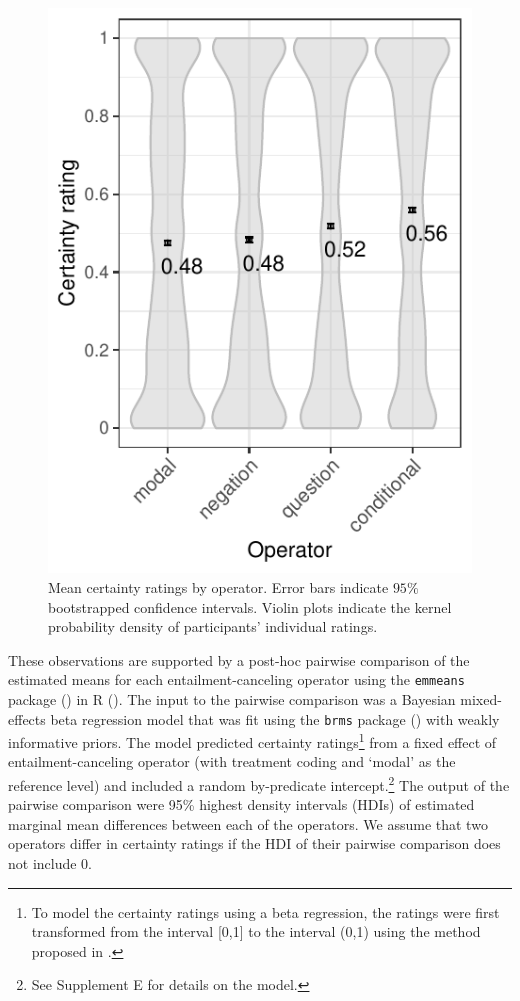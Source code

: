 \documentclass[a4paper,12pt,twoside]{article}
\begin{document}
            \begin{figure}[ht]
				\centering
				\includegraphics[scale = .7]{certainty-operator.pdf}
				\caption{Mean certainty ratings by operator. Error bars indicate $95\%$ bootstrapped confidence intervals. Violin plots indicate the kernel probability density of participants' individual ratings.
                }
				\label{fig:op-ratings}
			\end{figure}

        These observations are supported by a post-hoc pairwise comparison of the estimated means for each entailment-canceling operator using the \texttt{emmeans} package (\citealt{emmeans}) in R (\citealt{r}). The input to the pairwise comparison was a Bayesian mixed-effects beta regression model that was fit using the \texttt{brms} package (\citealt{buerkner2017}) with weakly informative priors. The model predicted certainty ratings\footnote{To model the certainty ratings using a beta regression, the ratings were first transformed from the interval [0,1] to the interval (0,1) using the method proposed in \citealt{smithson_better_2006}.} from a fixed effect of entailment-canceling operator (with treatment coding and `modal' as the reference level) and included a random by-predicate intercept.\footnote{See Supplement E for details on the model.} The output of the pairwise comparison were 95\% highest density intervals (HDIs) of estimated marginal mean differences between each of the operators. We assume that two operators differ in certainty ratings if the HDI of their pairwise comparison does not include 0. 
\end{document}
